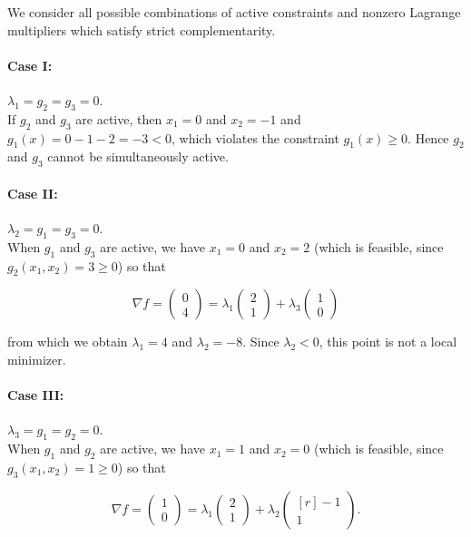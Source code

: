 \begin{solution}
    We consider all possible combinations of active constraints and nonzero Lagrange multipliers which satisfy strict 
    complementarity.

    \paragraph{Case I:} $\lambda_1 = g_2 = g_3 = 0.$ \ \\
    If $g_2$ and $g_3$ are active, then $x_1 = 0$ and $x_2 = -1$ and $g_1(x) = 0 - 1 - 2 = -3 < 0$, which violates the
    constraint $g_1(x) \ge 0$. Hence $g_2$ and $g_3$ cannot be simultaneously active.

    \paragraph{Case II:} $\lambda_2 = g_1 = g_3 = 0.$ \ \\
    When $g_1$ and $g_3$ are active, we have $x_1 = 0$ and $x_2 = 2$ (which is feasible, since $g_2(x_1, x_2) = 3 \ge 0$) so
    that 

    $$
    \nabla f = \begin{pmatrix*}
           0 \\
           4
    \end{pmatrix*} = \lambda_1 \begin{pmatrix*}
           2 \\
           1
    \end{pmatrix*} + \lambda_3 \begin{pmatrix*}
           1 \\
           0
    \end{pmatrix*}
    $$
    
    from which we obtain $\lambda_1 = 4$ and $\lambda_2 = -8$. Since $\lambda_2 < 0$, this point is not a local 
    minimizer.

    \paragraph{Case III:} $\lambda_3 = g_1 = g_2 = 0.$ \ \\
    When $g_1$ and $g_2$ are active, we have $x_1 = 1$ and $x_2 = 0$ (which is feasible, since 
    $g_3(x_1, x_2) = 1 \ge 0$) so that 

    $$
    \nabla f = \begin{pmatrix*}
           1 \\
           0
    \end{pmatrix*} = \lambda_1 \begin{pmatrix*}
           2 \\
           1
    \end{pmatrix*} + \lambda_2 \begin{pmatrix*}[r]
          -1 \\
           1
    \end{pmatrix*}.
    $$
    

\end{solution}
